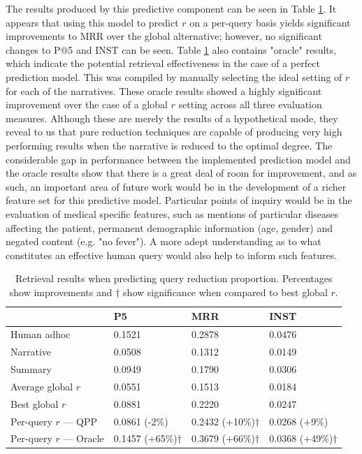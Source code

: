\documentclass[a4paper]{report}
\begin{document}
The results produced by this predictive component can be seen in Table \ref{tbl:glm}. It appears that using this model to predict $r$ on a per-query basis yields significant improvements to MRR over the global alternative; however, no significant changes to P@5 and INST can be seen. Table \ref{tbl:glm} also contains "oracle" results, which indicate the potential retrieval effectiveness in the case of a perfect prediction model. This was compiled by manually selecting the ideal setting of $r$ for each of the narratives. These oracle results showed a highly significant improvement over the case of a global $r$ setting across all three evaluation measures. Although these are merely the results of a hypothetical mode, they reveal to us that pure reduction techniques are capable of producing very high performing results when the narrative is reduced to the optimal degree. The considerable gap in performance between the implemented prediction model and the oracle results show that there is a great deal of room for improvement, and as such, an important area of future work would be in the development of a richer feature set for this predictive model. Particular points of inquiry would be in the evaluation of medical specific features, such as mentions of particular diseases affecting the patient, permanent demographic information (age, gender) and negated content (e.g. "no fever"). A more adept understanding as to what constitutes an effective human query would also help to inform such features.

\begin{table}
  \label{tbl:glm}
  \caption{Retrieval results when predicting query reduction proportion. Percentages show improvements and $\dagger$ show significance when compared to best global $r$.}
\begin{center}
  \begin{tabular}{@{}llll@{}}
    \toprule
    &P5&MRR&INST\\
    \midrule
    Human adhoc& 0.1521 & 0.2878 & 0.0476\\
    Narrative & 0.0508 & 0.1312 & 0.0149\\
    Summary & 0.0949 & 0.1790 & 0.0306 \\
    Average global $r$  & 0.0551 & 0.1513 & 0.0184\\
    Best global $r$ & 0.0881 & 0.2220 & 0.0247 \\
   Per-query $r$ --- QPP & 0.0861 (-2\%)  & 0.2432 (+10\%)$\dagger$ & 0.0268 (+9\%) \\
    Per-query $r$ --- Oracle & 0.1457 (+65\%)$\dagger$ & 0.3679 (+66\%)$\dagger$ & 0.0368 (+49\%)$\dagger$ \\
  \bottomrule
\end{tabular}
\end{center}
\end{table}
\end{document}
